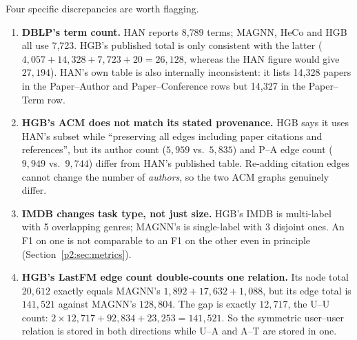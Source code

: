 \noindent Four specific discrepancies are worth flagging.
\begin{enumerate}\itemsep2pt
\item \textbf{DBLP's term count.} HAN reports 8{,}789 terms; MAGNN, HeCo and HGB all use 7{,}723.
  HGB's published total is only consistent with the latter
  ($4{,}057+14{,}328+7{,}723+20=26{,}128$, whereas the HAN figure would give $27{,}194$). HAN's own
  table is also internally inconsistent: it lists 14{,}328 papers in the Paper--Author and
  Paper--Conference rows but 14{,}327 in the Paper--Term row.
\item \textbf{HGB's ACM does not match its stated provenance.} HGB says it uses HAN's subset while
  ``preserving all edges including paper citations and references'', but its author count
  ($5{,}959$ vs.\ $5{,}835$) and P--A edge count ($9{,}949$ vs.\ $9{,}744$) differ from HAN's
  published table. Re-adding citation edges cannot change the number of \emph{authors}, so the two
  ACM graphs genuinely differ.
\item \textbf{IMDB changes task type, not just size.} HGB's IMDB is multi-label with 5 overlapping
  genres; MAGNN's is single-label with 3 disjoint ones. An F1 on one is not comparable to an F1 on
  the other even in principle (Section~\ref{p2:sec:metrics}).
\item \textbf{HGB's LastFM edge count double-counts one relation.} Its node total $20{,}612$
  exactly equals MAGNN's $1{,}892+17{,}632+1{,}088$, but its edge total is $141{,}521$ against
  MAGNN's $128{,}804$. The gap is exactly $12{,}717$, the U--U count:
  $2\times12{,}717+92{,}834+23{,}253=141{,}521$. So the symmetric user--user relation is stored in
  both directions while U--A and A--T are stored in one.
\end{enumerate}

